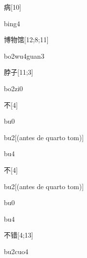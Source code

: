 \begin{verbete}[bing4]{病}[10]
\begin{pronuncia}{bing4}
\end{pronuncia}
\end{verbete}

\begin{verbete}[bo2wu4guan3]{博物馆}[12;8;11]
\begin{pronuncia}{bo2wu4guan3}
\end{pronuncia}
\end{verbete}

\begin{verbete}[bo2zi0]{脖子}[11;3]
\begin{pronuncia}{bo2zi0}
\end{pronuncia}
\end{verbete}

\begin{verbete}[bu0]{不}[4]
\begin{pronuncia}{bu0}
\end{pronuncia}
\begin{pronuncia}{bu2}[(antes de quarto tom)]
\end{pronuncia}
\begin{pronuncia}{bu4}
\end{pronuncia}
\end{verbete}

\begin{verbete}[bu2]{不}[4]
\begin{pronuncia}[\\]{bu2}[(antes de quarto tom)]
\end{pronuncia}
\begin{pronuncia}{bu0}
\end{pronuncia}
\begin{pronuncia}{bu4}
\end{pronuncia}
\end{verbete}

\begin{verbete}[bu2cuo4]{不错}[4;13]
\begin{pronuncia}{bu2cuo4}
\end{pronuncia}
\end{verbete}

